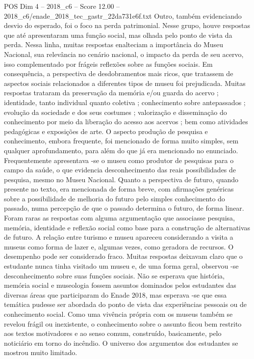 \begin{textsample}{POS Dim 4 – 2018\_c6 – Score 12.00 – 2018\_c6/enade\_2018\_tec\_gastr\_22da731e6f.txt}
Outro, também evidenciando desvio do esperado, foi o foco na perda patrimonial.
Nesse grupo, houve respostas que até apresentaram uma função social, mas olhada pelo ponto de vista da perda.
Nessa linha, muitas respostas enalteciam a importância do Museu Nacional, sua relevância no cenário nacional, o impacto da perda de seu acervo, isso complementado por frágeis reflexões sobre as funções sociais.
Em consequência, a perspectiva de desdobramentos mais ricos, que tratassem de aspectos sociais relacionados a diferentes tipos de museu foi prejudicada.
Muitas respostas trataram da preservação da memória e/ou guarda do acervo ; identidade, tanto individual quanto coletiva ; conhecimento sobre antepassados ; evolução da sociedade e dos seus costumes ; valorização e disseminação do conhecimento por meio da liberação do acesso aos acervos ; bem como atividades pedagógicas e exposições de arte.
O aspecto produção de pesquisa e conhecimento, embora frequente, foi mencionado de forma muito simples, sem qualquer aprofundamento, para além do que já era mencionado no enunciado.
Frequentemente apresentava -se o museu como produtor de pesquisas para o campo da saúde, o que evidencia desconhecimento das reais possibilidades de pesquisa, mesmo no Museu Nacional.
Quanto a perspectiva de futuro, quando presente no texto, era mencionada de forma breve, com afirmações genéricas sobre a possibilidade de melhoria do futuro pelo simples conhecimento do passado, numa percepção de que o passado determina o futuro, de forma linear.
Foram raras as respostas com alguma argumentação que associasse pesquisa, memória, identidade e reflexão social como base para a construção de alternativas de futuro.
A relação entre turismo e museu apareceu considerando a visita a museus como forma de lazer e, algumas vezes, como geradora de recursos.
O desempenho pode ser considerado fraco.
Muitas respostas deixavam claro que o estudante nunca tinha visitado um museu e, de uma forma geral, observou -se desconhecimento sobre suas funções sociais.
Não se esperava que história, memória social e museologia fossem assuntos dominados pelos estudantes das diversas áreas que participaram do Enade 2018, mas esperava -se que essa temática pudesse ser abordada do ponto de vista das experiências pessoais ou de conhecimento social.
Como uma vivência própria com os museus também se revelou frágil ou inexistente, o conhecimento sobre o assunto ficou bem restrito aos textos motivadores e ao senso comum, construído, basicamente, pelo noticiário em torno do incêndio.
O universo dos argumentos dos estudantes se mostrou muito limitado.

\end{textsample}
